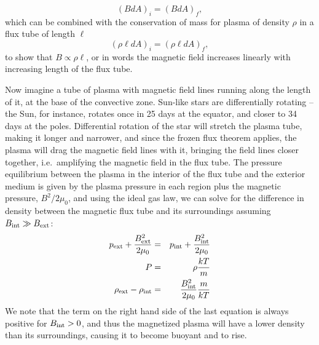 \begin{equation}
(B dA)_i = (B dA)_f,
\end{equation}
which can be combined with the conservation of mass for plasma of density $\rho$ in a flux tube of length $\ell$
\begin{equation}
(\rho \ell dA)_i = (\rho \ell dA)_f,
\end{equation}
to show that $B \propto \rho \ell$, or in words the magnetic field increases linearly with increasing length of the flux tube.

Now imagine a tube of plasma with magnetic field lines running along the length of it, at the base of the convective zone. Sun-like stars are differentially rotating -- the Sun, for instance, rotates once in 25 days at the equator, and closer to 34 days at the poles. Differential rotation of the star will stretch the plasma tube, making it longer and narrower, and since the frozen flux theorem applies, the plasma will drag the magnetic field lines with it, bringing the field lines closer together, i.e.\ amplifying the magnetic field in the flux tube. The pressure equilibrium between the plasma in the interior of the flux tube and the exterior medium is given by the plasma pressure in each region plus the magnetic pressure, $B^2/2\mu_0$, and using the ideal gas law, we can solve for the difference in density between the magnetic flux tube and its surroundings assuming $B_{\rm int} \gg B_{\rm ext}$:
\begin{eqnarray}
p_{\rm ext} + \frac{B_{\rm ext}^2}{2\mu_0} &=& p_{\rm int} + \frac{B_{\rm int}^2}{2\mu_0}\\
P &=& \rho \frac{kT}{m} \\
\rho_{\rm ext} - \rho_{\rm int} &=& \frac{B_{\rm int}^2}{2\mu_0} \frac{m}{kT}
\end{eqnarray}
We note that the term on the right hand side of the last equation is always positive for $B_{\rm int} > 0$, and thus the magnetized plasma will have a lower density than its surroundings, causing it to become buoyant and to rise. 

